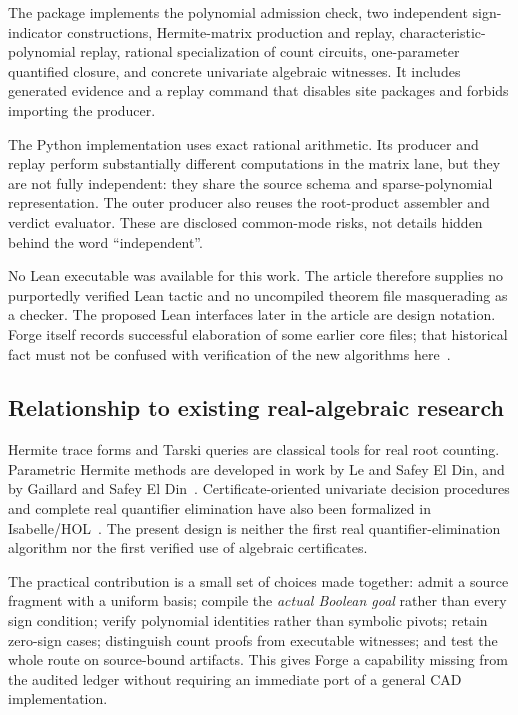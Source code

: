 The package implements the polynomial admission check, two independent sign-indicator constructions, Hermite-matrix production and replay, characteristic-polynomial replay, rational specialization of count circuits, one-parameter quantified closure, and concrete univariate algebraic witnesses. It includes generated evidence and a replay command that disables site packages and forbids importing the producer.

The Python implementation uses exact rational arithmetic. Its producer and replay perform substantially different computations in the matrix lane, but they are not fully independent: they share the source schema and sparse-polynomial representation. The outer producer also reuses the root-product assembler and verdict evaluator. These are disclosed common-mode risks, not details hidden behind the word ``independent''.

No Lean executable was available for this work. The article therefore supplies no purportedly verified Lean tactic and no uncompiled theorem file masquerading as a checker. The proposed Lean interfaces later in the article are design notation. Forge itself records successful elaboration of some earlier core files; that historical fact must not be confused with verification of the new algorithms here~\cite{forge}.

\subsection{Relationship to existing real-algebraic research}

Hermite trace forms and Tarski queries are classical tools for real root counting. Parametric Hermite methods are developed in work by Le and Safey El Din, and by Gaillard and Safey El Din~\cite{le-safey,gaillard-safey}. Certificate-oriented univariate decision procedures and complete real quantifier elimination have also been formalized in Isabelle/HOL~\cite{li-passmore-paulson,kosaian-tan-platzer}. The present design is neither the first real quantifier-elimination algorithm nor the first verified use of algebraic certificates.

The practical contribution is a small set of choices made together: admit a source fragment with a uniform basis; compile the \emph{actual Boolean goal} rather than every sign condition; verify polynomial identities rather than symbolic pivots; retain zero-sign cases; distinguish count proofs from executable witnesses; and test the whole route on source-bound artifacts. This gives Forge a capability missing from the audited ledger without requiring an immediate port of a general CAD implementation.

